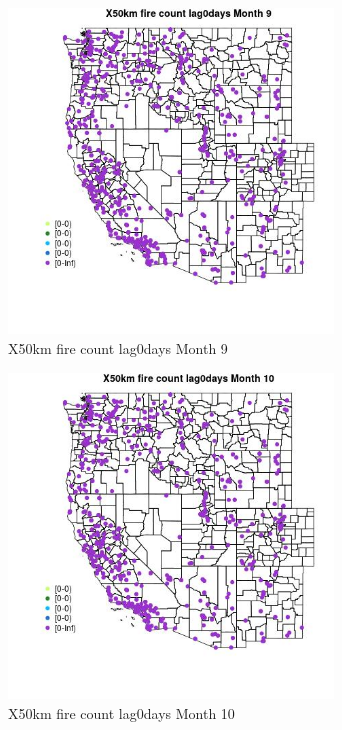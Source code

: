 \begin{figure} 
\centering  
\includegraphics[width=0.77\textwidth]{Code_Outputs/Report_ML_input_PM25_Step4_part_e_de_duplicated_aves_compiled_2019-05-14wNAs_MapObsMo9X50km_fire_count_lag0days.jpg} 
\caption{\label{fig:Report_ML_input_PM25_Step4_part_e_de_duplicated_aves_compiled_2019-05-14wNAsMapObsMo9X50km_fire_count_lag0days}X50km fire count lag0days Month 9} 
\end{figure} 
 

\begin{figure} 
\centering  
\includegraphics[width=0.77\textwidth]{Code_Outputs/Report_ML_input_PM25_Step4_part_e_de_duplicated_aves_compiled_2019-05-14wNAs_MapObsMo10X50km_fire_count_lag0days.jpg} 
\caption{\label{fig:Report_ML_input_PM25_Step4_part_e_de_duplicated_aves_compiled_2019-05-14wNAsMapObsMo10X50km_fire_count_lag0days}X50km fire count lag0days Month 10} 
\end{figure} 
 

